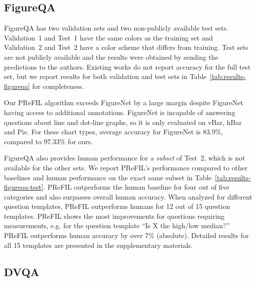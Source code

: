 \documentclass[10pt,twocolumn]{article}
\begin{document}
\subsection{FigureQA}


FigureQA has two validation sets and two non-publicly available test sets. Validation~1 and Test~1 have the same colors as the training set and Validation~2 and Test~2 have a color scheme that differs from training. Test sets are not publicly available and the results were obtained by sending the predictions to the authors. Existing works do not report accuracy for the full test set, but we report results for both validation and test sets in Table~\ref{tab:results-figureqa} for completeness.

Our PReFIL algorithm exceeds FigureNet by a large margin despite FigureNet having access to additional annotations. FigureNet is incapable of answering questions about line and dot-line graphs, so it is only evaluated on vBar, hBar and Pie. For these chart types, average accuracy for FigureNet is 83.9\%, compared to 97.33\% for ours.

 FigureQA also provides human performance for a \textit{subset} of Test~2, which is not available for the other sets. We report PReFIL's performance compared to other baselines and human performance on the exact same subset in Table~\ref{tab:results-figureqa-test}. PReFIL outperforms the human baseline for four out of five categories and also surpasses overall human accuracy. When analyzed for different question templates, PReFIL outperforms humans  for 12 out of 15 question templates. PReFIL shows the most improvements for questions requiring  measurements, e.g. for the question template  ``Is X the high/low median?'' PReFIL outperforms human accuracy by over 7\% (absolute). Detailed results for all 15 templates are presented in the supplementary materials.

\subsection{DVQA}
\end{document}
